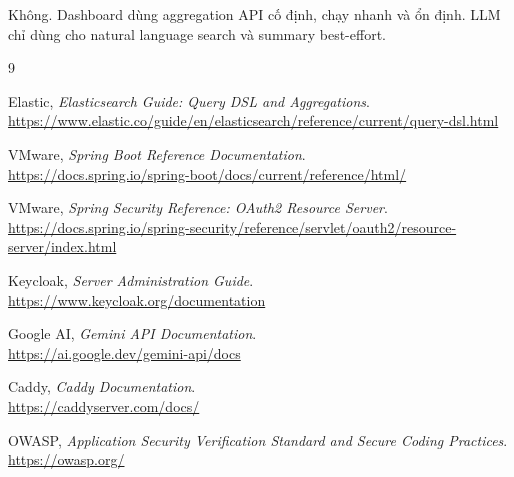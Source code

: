\documentclass[12pt,a4paper]{report}
\begin{document}
Không. Dashboard dùng aggregation API cố định, chạy nhanh và ổn định. LLM chỉ dùng cho natural language search và summary best-effort.

\begin{thebibliography}{9}

Elastic, \textit{Elasticsearch Guide: Query DSL and Aggregations}.\\
\url{https://www.elastic.co/guide/en/elasticsearch/reference/current/query-dsl.html}

VMware, \textit{Spring Boot Reference Documentation}.\\
\url{https://docs.spring.io/spring-boot/docs/current/reference/html/}

VMware, \textit{Spring Security Reference: OAuth2 Resource Server}.\\
\url{https://docs.spring.io/spring-security/reference/servlet/oauth2/resource-server/index.html}

Keycloak, \textit{Server Administration Guide}.\\
\url{https://www.keycloak.org/documentation}

Google AI, \textit{Gemini API Documentation}.\\
\url{https://ai.google.dev/gemini-api/docs}

Caddy, \textit{Caddy Documentation}.\\
\url{https://caddyserver.com/docs/}

OWASP, \textit{Application Security Verification Standard and Secure Coding Practices}.\\
\url{https://owasp.org/}

\end{thebibliography}
\end{document}
